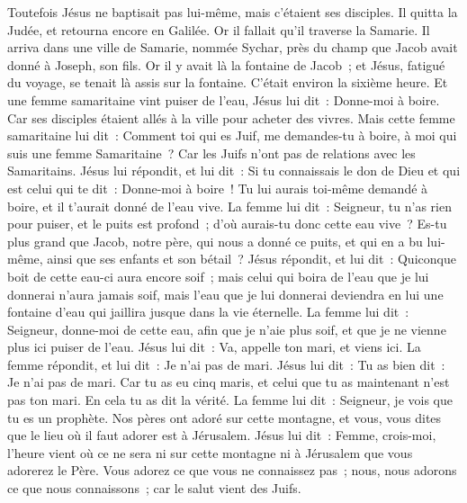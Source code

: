 \begin{multicols}{2}
Toutefois Jésus ne baptisait pas lui-même, mais c'étaient ses disciples.
Il quitta la Judée, et retourna encore en Galilée.
Or il fallait qu'il traverse la Samarie.
Il arriva dans une ville de Samarie, nommée Sychar, près du champ que Jacob avait donné à Joseph, son fils.
Or il y avait là la fontaine de Jacob~; et Jésus, fatigué du voyage, se tenait là assis sur la fontaine. C'était environ la sixième heure.
Et une femme samaritaine vint puiser de l'eau, Jésus lui dit~: Donne-moi à boire.
Car ses disciples étaient allés à la ville pour acheter des vivres.
Mais cette femme samaritaine lui dit~: Comment toi qui es Juif, me demandes-tu à boire, à moi qui suis une femme Samaritaine~? Car les Juifs n'ont pas de relations avec les Samaritains.
Jésus lui répondit, et lui dit~: Si tu connaissais le don de Dieu et qui est celui qui te dit~: Donne-moi à boire~! Tu lui aurais toi-même demandé à boire, et il t'aurait donné de l'eau vive.
La femme lui dit~: Seigneur, tu n'as rien pour puiser, et le puits est profond~; d'où aurais-tu donc cette eau vive~?
Es-tu plus grand que Jacob, notre père, qui nous a donné ce puits, et qui en a bu lui-même, ainsi que ses enfants et son bétail~?
Jésus répondit, et lui dit~: Quiconque boit de cette eau-ci aura encore soif~;
mais celui qui boira de l'eau que je lui donnerai n'aura jamais soif, mais l'eau que je lui donnerai deviendra en lui une fontaine d'eau qui jaillira jusque dans la vie éternelle.
La femme lui dit~: Seigneur, donne-moi de cette eau, afin que je n'aie plus soif, et que je ne vienne plus ici puiser de l'eau.
Jésus lui dit~: Va, appelle ton mari, et viens ici.
La femme répondit, et lui dit~: Je n'ai pas de mari. Jésus lui dit~: Tu as bien dit~: Je n'ai pas de mari.
Car tu as eu cinq maris, et celui que tu as maintenant n'est pas ton mari. En cela tu as dit la vérité.
La femme lui dit~: Seigneur, je vois que tu es un prophète.
Nos pères ont adoré sur cette montagne, et vous, vous dites que le lieu où il faut adorer est à Jérusalem.
Jésus lui dit~: Femme, crois-moi, l'heure vient où ce ne sera ni sur cette montagne ni à Jérusalem que vous adorerez le Père.
Vous adorez ce que vous ne connaissez pas~; nous, nous adorons ce que nous connaissons~; car le salut vient des Juifs.

\end{multicols}
